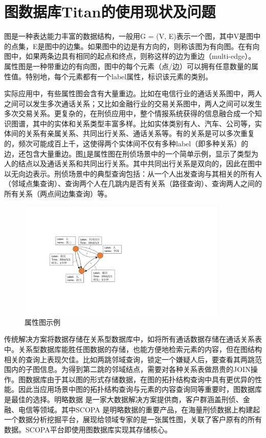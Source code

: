 \section{图数据库Titan的使用现状及问题}
图是一种表达能力丰富的数据结构，一般用G = (V, E)表示一个图，其中V是图中的点集，E是图中的边集。如果图中的边是有方向的，则称该图为有向图。在有向图中，如果两条边具有相同的起点和终点，则称这样的边为重边（multi-edge）。属性图\supercite{property_graph}是一种带重边的有向图，图中的每个元素（点/边）可以拥有任意数量的属性值。特别地，每个元素都有一个label属性，标识该元素的类别。

实际应用中，有些属性图会含有大量重边。比如在电信行业的通话关系图中，两人之间可以发生多次通话关系；又比如金融行业的交易关系图中，两人之间可以发生多次交易关系。更复杂的，在刑侦应用中，整个情报系统获得的信息融合成一个知识图谱\supercite{knowledge_graph}，其中的实体和关系类型丰富多样。比如实体类别有人、汽车、公司等，实体间的关系有亲属关系、共同出行关系、通话关系等。有的关系是可以多次重复的，频次可能成百上千，这使得两个实体间不仅有多种label（即多种关系）的边，还包含大量重边。图\ref{fig:property_graph}是属性图在刑侦场景中的一个简单示例，显示了类型为人的结点以及通话关系和共同出行关系。其中共同出行关系是双向的，因此在图中以无向边表示。刑侦场景中的典型查询包括：从一个人出发查询与其相关的所有人（邻域点集查询）、查询两个人在几跳内是否有关系（路径查询）、查询两人之间的所有关系（两点间边集查询）等。

\begin{figure}[htbp]
\centering
\includegraphics[width=100mm]{fig/property_graph.pdf}
\caption{属性图示例}
\label{fig:property_graph}
\end{figure}

传统解决方案将数据存储在关系型数据库中，如将所有通话数据存储在通话关系表中。关系型数据库能胜任图数据的存储，也能方便地检索元素的内容，但在图结构相关的查询上表现欠佳。比如两跳邻域查询，锁定一个嫌疑人后，要查看其两跳范围内的子图信息。为得到第二跳的邻域结点，需要对各种关系表做昂贵的JOIN操作。图数据库由于其以图的形式存储数据，在图的拓扑结构查询中具有更优异的性能。因此当应用场景中图的拓扑结构查询与元素的内容查询同等重要时，图数据库是最佳的选择。明略数据 是一家大数据解决方案提供商，客户群涵盖刑侦、金融、电信等领域。其中SCOPA 是明略数据的重要产品，在海量刑侦数据上构建起一个数据分析挖掘平台，展现给领域专家的是一张属性图，关联了客户原有的所有数据。SCOPA平台即使用图数据库实现其存储核心。

